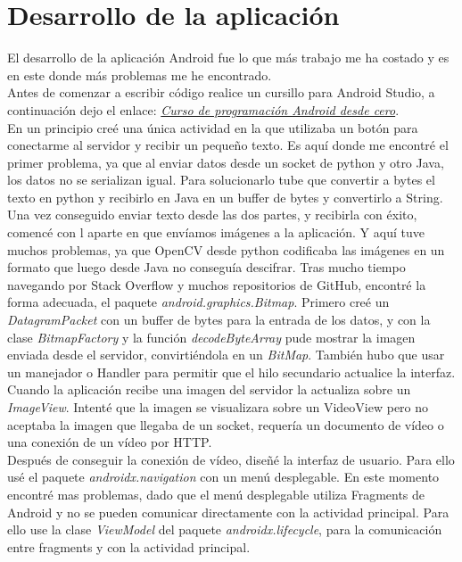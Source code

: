 \section{Desarrollo de la aplicación}
El desarrollo de la aplicación Android fue lo que más trabajo me ha costado y es en este donde más problemas me he encontrado.\\

Antes de comenzar a escribir código realice un cursillo para Android Studio, a continuación dejo el enlace: \href{https://www.youtube.com/watch?v=tyx05coXixw&list=PLyvsggKtwbLX06iMtXnRGX5lyjiiMaT2y}{\textit{Curso de programación Android desde cero}}.\\

En un principio creé una única actividad en la que utilizaba un botón para conectarme al servidor y recibir un pequeño texto. 
Es aquí donde me encontré el primer problema, ya que al enviar datos desde un socket de python y otro Java, los datos no se serializan igual. Para solucionarlo tube que convertir a bytes el texto en python y recibirlo en Java en un buffer de bytes y convertirlo a String.\\

Una vez conseguido enviar texto desde las dos partes, y recibirla con éxito, comencé con l aparte en que envíamos imágenes a la aplicación. 
Y aquí tuve muchos problemas, ya que OpenCV desde python codificaba las imágenes en un formato que luego desde Java no conseguía descifrar. 
Tras mucho tiempo navegando por Stack Overflow y muchos repositorios de GitHub, encontré la forma adecuada, el paquete \textit{android.graphics.Bitmap}.
Primero creé un \textit{DatagramPacket} con un buffer de bytes para la entrada de los datos, y con la clase \textit{BitmapFactory} y la función \textit{decodeByteArray} pude mostrar la imagen enviada desde el servidor, convirtiéndola en un \textit{BitMap}. 
También hubo que usar un manejador o Handler para permitir que el hilo secundario actualice la interfaz.\\

Cuando la aplicación recibe una imagen del servidor la actualiza sobre un \textit{ImageView}. Intenté que la imagen se visualizara sobre un VideoView pero no aceptaba la imagen que llegaba de un socket, requería un documento de vídeo o una conexión de un vídeo por HTTP.\\

Después de conseguir la conexión de vídeo, diseñé la interfaz de usuario.
Para ello usé el paquete \textit{androidx.navigation} con un menú desplegable. 
En este momento encontré mas problemas, dado que el menú desplegable utiliza Fragments de Android y no se pueden comunicar directamente con la actividad principal.
Para ello use la clase \textit{ViewModel} del paquete \textit{androidx.lifecycle}, para la comunicación entre fragments y con la actividad principal.\\

